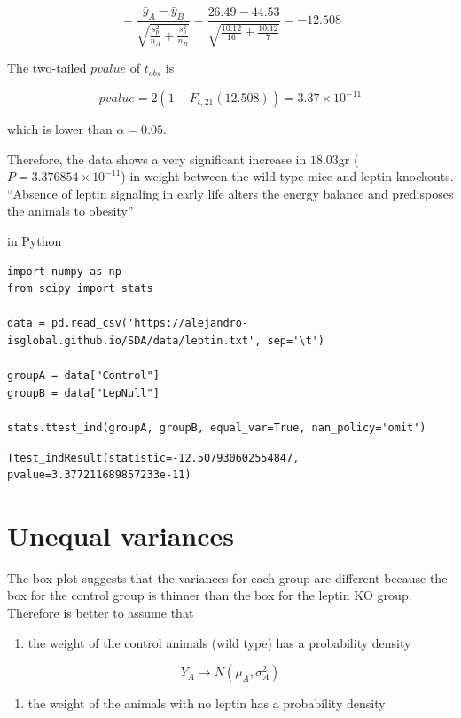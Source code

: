 \documentclass[
]{book}
\providecommand{\tightlist}{%
  \setlength{\itemsep}{0pt}\setlength{\parskip}{0pt}}
\begin{document}
\[=\frac{\bar{y}_A-\bar{y}_B }{\sqrt{\frac{s^2_p}{n_A}+\frac{s^2_p}{n_B}}}=\frac{26.49-44.53}{\sqrt{\frac{10.12}{16}+\frac{10.12}{7}}}=-12.508\]

The two-tailed \(pvalue\) of \(t_{obs}\) is

\[pvalue=2(1-F_{t,21}(12.508))=3.37 \times 10^{-11}\]

which is lower than \(\alpha=0.05\).

Therefore, the data shows a very significant increase in \(18.03\)gr (\(P=3.376854 \times 10^{-11}\)) in weight between the wild-type mice and leptin knockouts. ``Absence of leptin signaling in early life alters the energy balance and predisposes the animals to obesity''

in Python

\begin{verbatim}
import numpy as np
from scipy import stats

data = pd.read_csv('https://alejandro-isglobal.github.io/SDA/data/leptin.txt', sep='\t')

groupA = data["Control"]
groupB = data["LepNull"]

stats.ttest_ind(groupA, groupB, equal_var=True, nan_policy='omit')
\end{verbatim}

\begin{verbatim}
Ttest_indResult(statistic=-12.507930602554847, pvalue=3.377211689857233e-11)
\end{verbatim}

\hypertarget{unequal-variances}{%
\section{Unequal variances}\label{unequal-variances}}

The box plot suggests that the variances for each group are different because the box for the control group is thinner than the box for the leptin KO group. Therefore is better to assume that

\begin{enumerate}
\def\labelenumi{\arabic{enumi}.}
\tightlist
\item
  the weight of the control animals (wild type) has a probability density
\end{enumerate}

\[Y_A \rightarrow N(\mu_A, \sigma_A^2)\]

\begin{enumerate}
\def\labelenumi{\arabic{enumi}.}
\setcounter{enumi}{1}
\tightlist
\item
  the weight of the animals with no leptin has a probability density
\end{enumerate}
\end{document}
